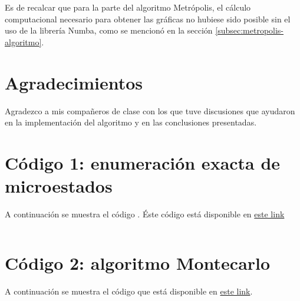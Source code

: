 \documentclass[%
 reprint,
 amsmath,amssymb,
 aps,
 pra,
]{revtex4-2}
\begin{document}
Es de recalcar que para la parte del algoritmo Metrópolis, el cálculo computacional necesario para obtener las gráficas no hubiese sido posible sin el uso de la librería Numba, como se mencionó en la sección \ref{subsec:metropolis-algoritmo}.

\section*{Agradecimientos}
Agradezco a mis compañeros de clase con los que tuve discusiones que ayudaron en la implementación del algoritmo y en las conclusiones presentadas.

\nocite{*}




\newpage


\appendix


\section{Código 1: enumeración exacta de microestados\label{appx:microestados}}

A continuación se muestra el código . Éste código está disponible en \href{https://github.com/jearistiz/Statistical-Physics-Projects/blob/master/2/matrix_squaring.py}{este link}

\inputminted[linenos,breaklines]{python}{code_1.py}

\section{Código 2: algoritmo Montecarlo\label{appx:montecarlo}}

A continuación se muestra el código que está disponible en \href{https://github.com/jearistiz/Statistical-Physics-Projects/blob/master/2/path_integral_naive_sampling.py}{este link}.

\inputminted[linenos,breaklines]{python}{code_2.py}
\end{document}
